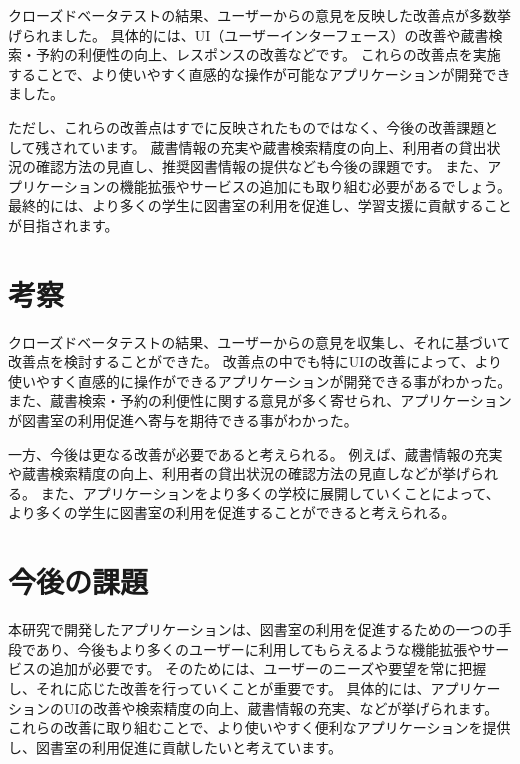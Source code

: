 \documentclass[pdflatex,ja=standard,twocolumn]{bxjsarticle}
\begin{document}
クローズドベータテストの結果、ユーザーからの意見を反映した改善点が多数挙げられました。
具体的には、UI（ユーザーインターフェース）の改善や蔵書検索・予約の利便性の向上、レスポンスの改善などです。
これらの改善点を実施することで、より使いやすく直感的な操作が可能なアプリケーションが開発できました。

ただし、これらの改善点はすでに反映されたものではなく、今後の改善課題として残されています。
蔵書情報の充実や蔵書検索精度の向上、利用者の貸出状況の確認方法の見直し、推奨図書情報の提供なども今後の課題です。
また、アプリケーションの機能拡張やサービスの追加にも取り組む必要があるでしょう。
最終的には、より多くの学生に図書室の利用を促進し、学習支援に貢献することが目指されます。

\section{考察}
クローズドベータテストの結果、ユーザーからの意見を収集し、それに基づいて改善点を検討することができた。
改善点の中でも特にUIの改善によって、より使いやすく直感的に操作ができるアプリケーションが開発できる事がわかった。
また、蔵書検索・予約の利便性に関する意見が多く寄せられ、アプリケーションが図書室の利用促進へ寄与を期待できる事がわかった。

一方、今後は更なる改善が必要であると考えられる。
例えば、蔵書情報の充実や蔵書検索精度の向上、利用者の貸出状況の確認方法の見直しなどが挙げられる。
また、アプリケーションをより多くの学校に展開していくことによって、より多くの学生に図書室の利用を促進することができると考えられる。
\section{今後の課題}
本研究で開発したアプリケーションは、図書室の利用を促進するための一つの手段であり、今後もより多くのユーザーに利用してもらえるような機能拡張やサービスの追加が必要です。
そのためには、ユーザーのニーズや要望を常に把握し、それに応じた改善を行っていくことが重要です。
具体的には、アプリケーションのUIの改善や検索精度の向上、蔵書情報の充実、などが挙げられます。
これらの改善に取り組むことで、より使いやすく便利なアプリケーションを提供し、図書室の利用促進に貢献したいと考えています。
\end{document}

